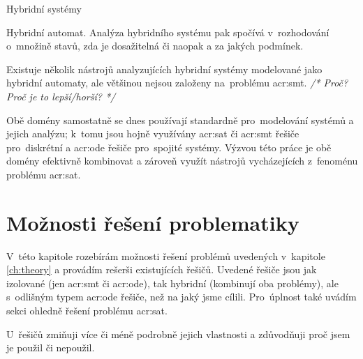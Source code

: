 \documentclass[thesis=M,czech]{FITthesis}[2012/06/26]
\newcommand{\acrlabel}[1]{acr:#1}
\newcommand{\acr}[1]{\acrshort{\acrlabel{#1}}}
\newcommand{\cmt}[1]{\textit{/* #1 */}}
\newcommand{\rf}[1]{\ref{#1}}
\begin{document}
\begin{section}{Hybridní systémy}
\begin{paragraph}{Hybridní automat.}
Analýza hybridního systému pak spočívá
v~rozhodování o~množině stavů,
zda je dosažitelná či naopak
a za jakých podmínek.

Existuje několik nástrojů
analyzujících hybridní systémy
modelované jako hybridní automaty,
ale většinou nejsou založeny
na~problému \acr{smt}.
\cmt{Proč? Proč je to lepší/horší?}
\end{paragraph} %


\bigskip

Obě domény samostatně se dnes
používají standardně pro~modelování systémů
a jejich analýzu;
k~tomu jsou hojně využívány
\acr{sat} či \acr{smt} řešiče pro~diskrétní
a \acr{ode} řešiče pro~spojité systémy.
Výzvou této práce je obě domény efektivně kombinovat
a zároveň využít nástrojů
vycházejících z~fenoménu problému \acr{sat}.
\end{section} %



\chapter{Možnosti řešení problematiky}\label{ch:search}
V~této kapitole rozebírám možnosti řešení problémů
uvedených v~kapitole \rf{ch:theory}
a provádím rešerši existujících řešičů.
Uvedené řešiče jsou jak izolované (jen \acr{smt} či \acr{ode}),
tak hybridní (kombinují oba problémy),
ale s~odlišným typem \acr{ode} řešiče, než na jaký jsme cílili.
Pro~úplnost také uvádím sekci ohledně řešení problému \acr{sat}.

U~řešičů zmiňuji více či méně podrobně
jejich vlastnosti a zdůvodňuji proč jsem je použil či nepoužil.

\end{document}
